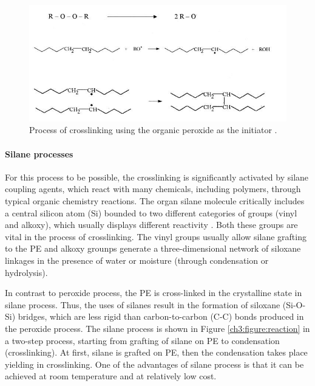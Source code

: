 \documentclass[12pt]{report}
\begin{document}
\begin{figure}[H]
    \centering
    \includegraphics[width=.9\textwidth]{process_of_crosslinking_using_the_organic_peroxide_as_the_initiator.jpg}
    \caption{Process of crosslinking using the organic peroxide as the initiator \cite{meola2005cross}. }
    \label{ch3:figure:crosslinking_process}
\end{figure}

\paragraph{Silane processes}
For this process to be possible, the crosslinking is significantly activated by silane coupling agents, which react with many chemicals, including polymers, through typical organic chemistry reactions. The organ silane molecule critically includes a central silicon atom (Si) bounded to two different categories of groups (vinyl and alkoxy), which usually displays different reactivity \cite{kurtz2009cross}. Both these groups are vital in the process of crosslinking. The vinyl groups usually allow silane grafting to the PE and alkoxy grounps generate a three-dimensional network of siloxane linkages in the presence of water or moisture (through condensation or hydrolysis). 

In contrast to peroxide process, the PE is cross-linked in the crystalline state in silane process. Thus, the uses of silanes result in the formation of siloxane (Si-O-Si) bridges, which are less rigid than carbon-to-carbon (C-C) bonds produced in the peroxide process. The silane process is shown in Figure \ref{ch3:figure:reaction} in a two-step process, starting from grafting of silane on PE to condensation (crosslinking). At first, silane is grafted on PE, then the condensation takes place yielding in crosslinking. One of the advantages of silane process is that it can be achieved at room temperature and at relatively low cost. 
\end{document}
